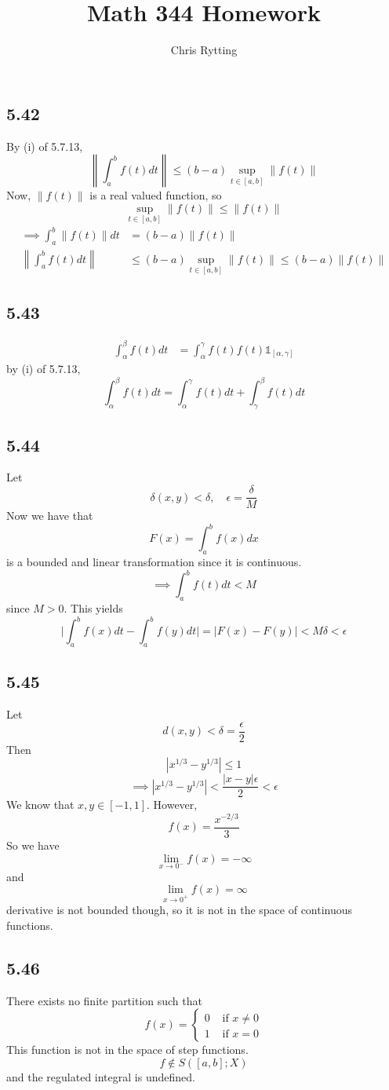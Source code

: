 \documentclass[letterpaper,12pt]{article}
\theoremstyle{definition}
\begin{document}
\title{Math 344 Homework }
\author{Chris Rytting}
\maketitle

\subsection*{5.42}


By (i) of 5.7.13, 
\[ \left\| \int^b_a f(t)dt\right\| \leq (b-a)\sup_{t\in[a,b]} \|f(t)\| \]
Now, $\|f(t)\|$ is a real valued function, so
\[\sup_{t\in[a,b]} \|f(t)\| \leq \|f(t)\|\]
\begin{align*}
\implies \int_a^b \|f(t)\|dt & = (b-a) \|f(t)\|\\
\left\|\int^b_a f(t) dt \right\| & \leq (b-a) \sup_{t\in[a,b]} \|f(t)\| \leq (b-a) \|f(t)\|
\end{align*}

\subsection*{5.43}
\begin{align*}
    \int_\alpha^\beta f(t) dt & = \int_\alpha ^\gamma f(t) f(t) \mathds{1}_{[\alpha,\gamma]}
\end{align*}
by (i) of 5.7.13,
\[\int^\beta _\alpha f(t) dt = \int_\alpha ^\gamma f(t)dt + \int_\gamma ^\beta f(t)dt \]


\subsection*{5.44}

Let 
\[\delta (x, y) < \delta, \quad \epsilon = \frac{\delta}{M}\]
Now we have that
\[ F(x) = \int_a^b f(x)dx\]
is a bounded and linear transformation since it is continuous.
\[\implies\int_a^b f(t)dt<M\]
since $M>0$. This yields
\[\big|\int_a^b f(x)dt - \int_a^b f(y)dt\big|=\left|F(x) - F(y)\right|<M\delta<\epsilon\]

\subsection*{5.45}
Let 
\[d(x,y)<\delta = \frac{\epsilon}{2}\] Then
\[|x^{1/3}-y^{1/3}|\leq 1\]
\[\implies |x^{1/3}- y^{1/3}| < \frac{|x-y|\epsilon}{2} < \epsilon\]
We know that $x,y\in [-1,1]$. However,
\[f(x)= \frac{x^{-2/3}}{3}\]
So we have 
\[\lim_{x\to 0^-}f(x) = - \infty\] and
\[\lim_{x\to 0^+}f(x) = \infty\]
derivative is not bounded though, so it is not in the space of continuous functions.

\subsection*{5.46}

There exists no finite partition such that 
\[f(x) = \begin{cases} 0 & \text{ if } x \neq 0\\
    1 &\text{ if } x =0
\end{cases}\]
This function is not in the space of step functions.  
\[ f \not \in S([a,b];X)\]
and the regulated integral is undefined.
\end{document}
